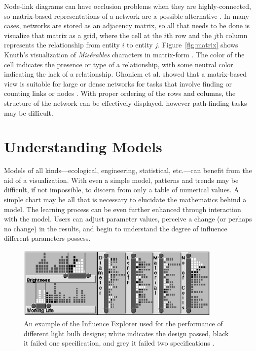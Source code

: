 Node-link diagrams can have occlusion problems when they are highly-connected, so matrix-based representations of a network are a possible alternative \cite{heer2010}.  In many cases, networks are stored as an adjacency matrix, so all that needs to be done is visualize that matrix as a grid, where the cell at the $i$th row and the $j$th column represents the relationship from entity $i$ to entity $j$.  Figure~\ref{fig:matrix} shows Knuth's visualization of \textit{Mis\'erables} characters in matrix-form \cite{knuth1993}.  The color of the cell indicates the presence or type of a relationship, with some neutral color indicating the lack of a relationship.  Ghoniem et al. showed that a matrix-based view is suitable for large or dense networks for tasks that involve finding or counting links or nodes \cite{ghoniem2004}.  With proper ordering of the rows and columns, the structure of the network can be effectively displayed, however path-finding tasks may be difficult.

\section{Understanding Models}

Models of all kinds---ecological, engineering, statistical, etc.---can benefit from the aid of a visualization.  With even a simple model, patterns and trends may be difficult, if not impossible, to discern from only a table of numerical values.  A simple chart may be all that is necessary to elucidate the mathematics behind a model.  The learning process can be even further enhanced through interaction with the model.  Users can adjust parameter values, perceive a change (or perhaps no change) in the results, and begin to understand the degree of influence different parameters possess.

\begin{figure}[h]
	\centering
	\includegraphics[width=10cm]{figures/eps/influenceExplorer.eps}
	\caption{An example of the Influence Explorer used for the performance of different light bulb designs; white indicates the design passed, black it failed one specification, and grey it failed two specifications \cite{tweedie1995}.}
	\label{fig:influenceExplorer}
\end{figure}

